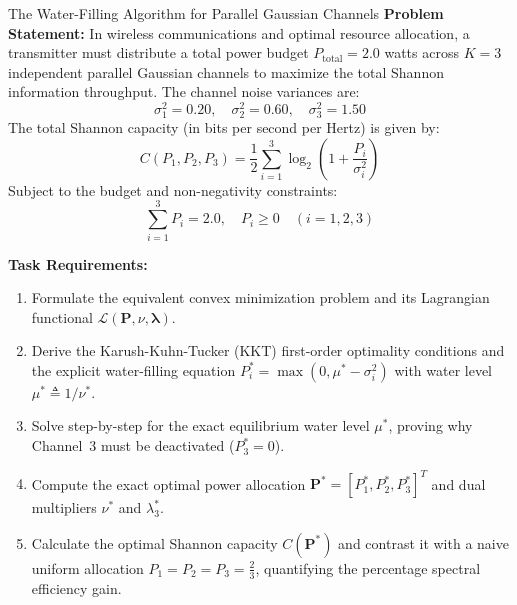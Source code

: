 \begin{examplebox}[breakable]{The Water-Filling Algorithm for Parallel Gaussian Channels}
\textbf{Problem Statement:}
In wireless communications and optimal resource allocation, a transmitter must distribute a total power budget $P_{\text{total}} = 2.0$ watts across $K = 3$ independent parallel Gaussian channels to maximize the total Shannon information throughput. The channel noise variances are:
\begin{equation}
\sigma_1^2 = 0.20, \quad \sigma_2^2 = 0.60, \quad \sigma_3^2 = 1.50
\end{equation}
The total Shannon capacity (in bits per second per Hertz) is given by:
\begin{equation}
C(P_1, P_2, P_3) = \frac{1}{2} \sum_{i=1}^3 \log_2\left( 1 + \frac{P_i}{\sigma_i^2} \right)
\end{equation}
Subject to the budget and non-negativity constraints:
\begin{equation}
\sum_{i=1}^3 P_i = 2.0, \quad P_i \ge 0 \quad (i = 1, 2, 3)
\end{equation}

\textbf{Task Requirements:}
\begin{enumerate}
    \item Formulate the equivalent convex minimization problem and its Lagrangian functional $\mathcal{L}(\mathbf{P}, \nu, \boldsymbol{\lambda})$.
    \item Derive the Karush-Kuhn-Tucker (KKT) first-order optimality conditions and the explicit water-filling equation $P_i^* = \max(0, \mu^* - \sigma_i^2)$ with water level $\mu^* \triangleq 1/\nu^*$.
    \item Solve step-by-step for the exact equilibrium water level $\mu^*$, proving why Channel~3 must be deactivated ($P_3^* = 0$).
    \item Compute the exact optimal power allocation $\mathbf{P}^* = [P_1^*, P_2^*, P_3^*]^T$ and dual multipliers $\nu^*$ and $\lambda_3^*$.
    \item Calculate the optimal Shannon capacity $C(\mathbf{P}^*)$ and contrast it with a naive uniform allocation $P_1 = P_2 = P_3 = \frac{2}{3}$, quantifying the percentage spectral efficiency gain.
\end{enumerate}

\tcblower


\end{examplebox}
